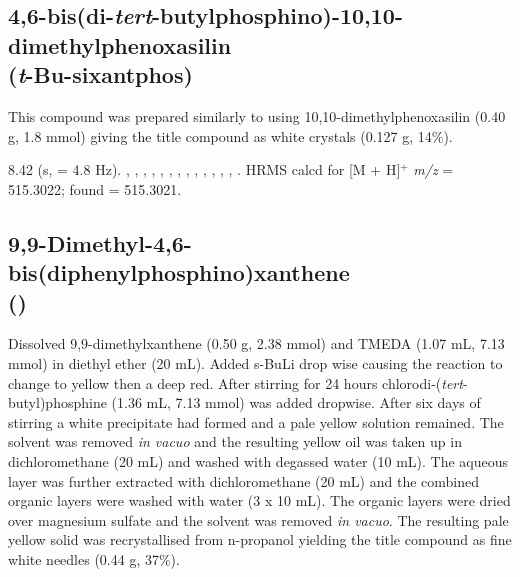 \subsection*{4,6-bis(di-\emph{tert}-butylphosphino)-10,10-dimethylphenoxasilin \\(\emph{t}-Bu-sixantphos)}


This compound was prepared similarly to \tButhixantphos{} using 10,10-dimethyl\-phenoxasilin (0.40 g, 1.8 mmol) giving the title compound as white crystals (0.127 g, 14\%).

8.42 (s,  = 4.8 Hz).
,
,
,
,
,
,
,
,
,
,
,
,
,
.
HRMS calcd for  [M + H]$^+$ \emph{m/z} = 515.3022; found = 515.3021.


\subsection*{9,9-Dimethyl-4,6-bis(diphenylphosphino)xanthene \\(\tBuxantphos)}


Dissolved 9,9-dimethylxanthene (0.50 g, 2.38 mmol) and \gls{TMEDA} (1.07 mL, 7.13 mmol) in diethyl ether (20 mL).  Added s-BuLi drop wise causing the reaction to change to yellow then a deep red.  After stirring for 24 hours chlorodi-(\emph{tert}-butyl)phosphine (1.36 mL, 7.13 mmol) was added dropwise.  After six days of stirring a white precipitate had formed and a pale yellow solution remained.  The solvent was removed \emph{in vacuo} and the resulting yellow oil was taken up in dichloromethane (20 mL) and washed with degassed water (10 mL).  The aqueous layer was further extracted with dichloromethane (20 mL) and the combined organic layers were washed with water (3 x 10 mL).  The organic layers were dried over magnesium sulfate and the solvent was removed \emph{in vacuo}.  The resulting pale yellow solid was recrystallised from n-propanol yielding the title compound as fine white needles (0.44 g, 37\%).

